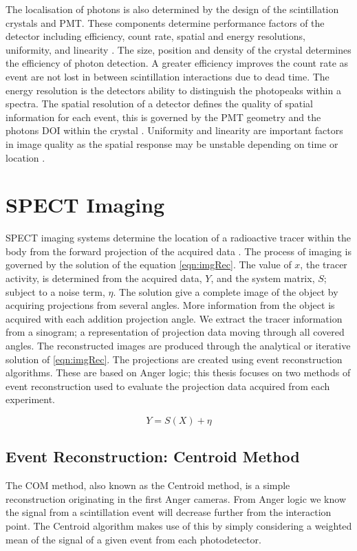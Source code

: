The localisation of photons is also determined by the design of the scintillation crystals and \acrshort{PMT}. These components determine performance factors of the detector including efficiency, count rate, spatial and energy resolutions, uniformity, and linearity \cite{Anger1966SensitivityCamera}. The size, position and density of the crystal determines the efficiency of photon detection. A greater efficiency improves the count rate as event are not lost in between scintillation interactions due to dead time. The energy resolution is the detectors ability to distinguish the photopeaks within a spectra. The spatial resolution of a detector defines the quality of spatial information for each event, this is governed by the \acrshort{PMT} geometry and the photons \acrlong{DOI} within the crystal \cite{Morrocchi2017}. Uniformity and linearity are important factors in image quality as the spatial response may be unstable depending on time or location \cite{LyraGeorgosopoulouRoutineInstrumentation}.

\section{SPECT Imaging} %
\acrshort{SPECT} imaging systems determine the location of a radioactive tracer within the body from the forward projection of the acquired data \cite{BasicOfNM}. The process of imaging is governed by the solution of the equation \ref{eqn:imgRec}. The value of $x$, the tracer activity, is determined from the acquired data, $Y$, and the system matrix, $S$; subject to a noise term, $\eta$. The solution give a complete image of the object by acquiring projections from several angles. More information from the object is acquired with each addition projection angle. We extract the tracer information from a sinogram; a representation of projection data moving through all covered angles. The reconstructed images are produced through the analytical or iterative solution of \ref{eqn:imgRec}. The projections are created using event reconstruction algorithms. These are based on Anger logic; this thesis focuses on two methods of event reconstruction used to evaluate the projection data acquired from each experiment.

\begin{equation} \label{eqn:imgRec}
        Y = S(X) + \eta 
\end{equation}

\subsection{Event Reconstruction: Centroid Method}
The \acrlong{COM} method, also known as the Centroid method, is a simple reconstruction originating in the first Anger cameras. From Anger logic we know the signal from a scintillation event will decrease further from the interaction point. The Centroid algorithm makes use of this by simply considering a weighted mean of the signal of a given event from each photodetector. 


